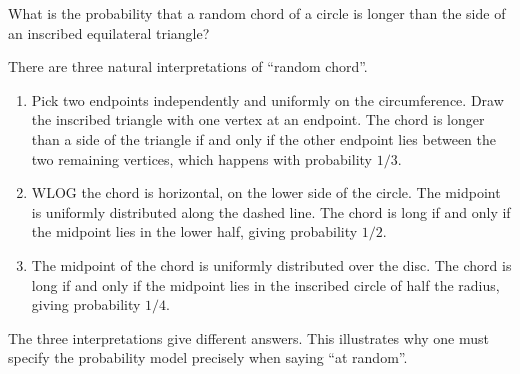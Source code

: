 \documentclass[a4paper]{article}
\begin{document}
\begin{eg}
  What is the probability that a random chord of a circle is longer than the side of an inscribed equilateral triangle?

  There are three natural interpretations of ``random chord''.
  \begin{enumerate}
    \item Pick two endpoints independently and uniformly on the circumference.
      Draw the inscribed triangle with one vertex at an endpoint.
      The chord is longer than a side of the triangle if and only if the other endpoint lies between the two remaining vertices, which happens with probability $1/3$.
      \begin{center}
      \end{center}
    \item WLOG the chord is horizontal, on the lower side of the circle.
      The midpoint is uniformly distributed along the dashed line.
      The chord is long if and only if the midpoint lies in the lower half, giving probability $1/2$.
      \begin{center}
      \end{center}
    \item The midpoint of the chord is uniformly distributed over the disc.
      The chord is long if and only if the midpoint lies in the inscribed circle of half the radius, giving probability $1/4$.
       \begin{center}
      \end{center}
  \end{enumerate}
  The three interpretations give different answers.
  This illustrates why one must specify the probability model precisely when saying ``at random''.
\end{eg}
\end{document}
